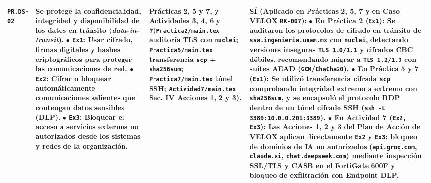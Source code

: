 \documentclass[letterpaper,11pt]{article}
\begin{document}
\begin{longtable}{|C{1.5cm}|L{5.3cm}|L{4.3cm}|L{5.8cm}|}
\texttt{PR.DS-02} &
\textbf{Se protege la confidencialidad, integridad y disponibilidad de los datos en tránsito (\textit{data-in-transit}).}\newline
$\bullet$ \texttt{Ex1}: \textbf{Usar cifrado, firmas digitales y hashes criptográficos para proteger las comunicaciones de red}.\newline
$\bullet$ \texttt{Ex2}: Cifrar o bloquear automáticamente comunicaciones salientes que contengan datos sensibles (DLP).\newline
$\bullet$ \texttt{Ex3}: \textbf{Bloquear el acceso a servicios externos no autorizados desde los sistemas y redes de la organización}. &
\textbf{Prácticas 2, 5 y 7, y Actividades 3, 4, 6 y 7}\newline (\texttt{Practica2/main.tex} auditoría TLS con \texttt{nuclei}; \texttt{Practica5/main.tex} transferencia \texttt{scp} + \texttt{sha256sum}; \texttt{Practica7/main.tex} túnel SSH; \texttt{Actividad7/main.tex} Sec. IV Acciones 1, 2 y 3). &
\textbf{SÍ (Aplicado en Prácticas 2, 5, 7 y en Caso VELOX \texttt{RK-007}):}\newline
$\bullet$ \textbf{En Práctica 2 (\texttt{Ex1}):} Se auditaron los protocolos de cifrado en tránsito de \texttt{ssa.ingenieria.unam.mx} con \texttt{nuclei}, detectando versiones inseguras \texttt{TLS 1.0/1.1} y cifrados CBC débiles, recomendando migrar a \texttt{TLS 1.2/1.3} con suites AEAD (\texttt{GCM}/\texttt{ChaCha20}).\newline
$\bullet$ \textbf{En Práctica 5 y 7 (\texttt{Ex1}):} Se utilizó transferencia cifrada \texttt{scp} comprobando integridad extremo a extremo con \texttt{sha256sum}, y se encapsuló el protocolo RDP dentro de un túnel cifrado SSH (\texttt{ssh -L 3389:10.0.0.201:3389}).\newline
$\bullet$ \textbf{En Actividad 7 (\texttt{Ex2, Ex3}):} Las Acciones 1, 2 y 3 del Plan de Acción de VELOX aplican directamente \texttt{Ex2} y \texttt{Ex3}: bloqueo de dominios de IA no autorizados (\texttt{api.groq.com}, \texttt{claude.ai}, \texttt{chat.deepseek.com}) mediante inspección SSL/TLS y CASB en el FortiGate 600F y bloqueo de exfiltración con Endpoint DLP. \\
\hline


\end{longtable}
\end{document}
